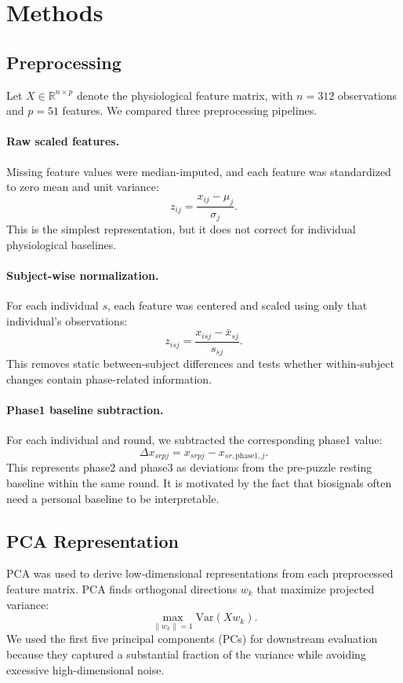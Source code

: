 \documentclass{article}
\begin{document}
\section*{Methods}
\subsection*{Preprocessing}
Let $X \in \mathbb{R}^{n \times p}$ denote the physiological feature matrix, with $n=312$ observations and $p=51$ features. We compared three preprocessing pipelines.

\paragraph{Raw scaled features.}
Missing feature values were median-imputed, and each feature was standardized to zero mean and unit variance:
\[
z_{ij} = \frac{x_{ij} - \mu_j}{\sigma_j}.
\]
This is the simplest representation, but it does not correct for individual physiological baselines.

\paragraph{Subject-wise normalization.}
For each individual $s$, each feature was centered and scaled using only that individual's observations:
\[
z_{isj} = \frac{x_{isj} - \bar{x}_{sj}}{s_{sj}}.
\]
This removes static between-subject differences and tests whether within-subject changes contain phase-related information.

\paragraph{Phase1 baseline subtraction.}
For each individual and round, we subtracted the corresponding phase1 value:
\[
\Delta x_{srpj} = x_{srpj} - x_{sr,\mathrm{phase1},j}.
\]
This represents phase2 and phase3 as deviations from the pre-puzzle resting baseline within the same round. It is motivated by the fact that biosignals often need a personal baseline to be interpretable.

\subsection*{PCA Representation}
PCA was used to derive low-dimensional representations from each preprocessed feature matrix. PCA finds orthogonal directions $w_k$ that maximize projected variance:
\[
\max_{\|w_k\|=1} \mathrm{Var}(Xw_k).
\]
We used the first five principal components (PCs) for downstream evaluation because they captured a substantial fraction of the variance while avoiding excessive high-dimensional noise.
\end{document}
